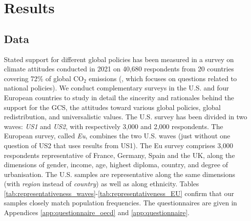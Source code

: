 \section{Results}
\subsection{Data}
Stated support for different global policies has been measured in %
a survey on climate attitudes conducted in 2021 on 40,680 respondents from 20 countries covering 72\% of global CO$_\text{2}$ emissions (\citealp{dechezlepretre_fighting_2022}, which focuses on questions related to national policies). %
We conduct complementary surveys in the U.S. and four European countries to study in detail the sincerity and rationales behind the support for the GCS, the attitudes toward various global policies, global redistribution, and universalistic values. The U.S. survey has been divided in two waves: \textit{US1} and \textit{US2}, with respectively 3,000 and 2,000 respondents. The European survey, called \textit{Eu}, combines the two U.S. waves (just without one question of US2 that uses results from US1). The Eu survey comprises 3,000 respondents representative of France, Germany, Spain and the UK, along the dimensions of gender, income, age, highest diploma, country, and degree of urbanisation. The U.S. samples are representative along the same dimensions (with \textit{region} instead of \textit{country}) as well as along ethnicity. Tables \ref{tab:representativeness_waves}-\ref{tab:representativeness_EU} confirm that our samples closely match population frequencies. The questionnaires are given in Appendices \ref{app:questionnaire_oecd} and \ref{app:questionnaire}.

